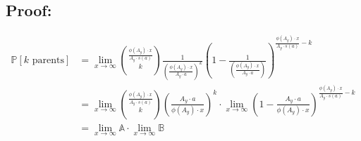 \documentclass{article}
\theoremstyle{definition}
\begin{document}
\subsection*{Proof:}
\begin{align*}
    \mathbb{P}[k \text{ parents}] & =  \lim_{x \to \infty}{\frac{\phi(A_y) \cdot x}{A_y \cdot s(a)} \choose k } \frac{1}{\left(\frac{\phi(A_y) \cdot x}{ A_y \cdot a}\right)^k} \left(1- \frac{1}{\left(\frac{\phi(A_y) \cdot x}{ A_y \cdot a}\right)}\right)^{\frac{\phi(A_y) \cdot x}{A_y \cdot s(a)  } -k} \\
                                  & =  \lim_{x \to \infty}{\frac{\phi(A_y) \cdot x}{A_y \cdot s(a)} \choose k } \left(\frac{A_y \cdot a}{\phi(A_y) \cdot x}\right)^k \cdot \lim_{x \to \infty}\left(1- \frac{A_y \cdot a}{\phi(A_y) \cdot x}\right)^{\frac{\phi(A_y) \cdot x}{A_y \cdot s(a)  } -k}           \\
                                  & =  \lim_{x \to \infty}\mathbb{A}  \cdot \lim_{x \to \infty} \mathbb{B}
\end{align*}
\end{document}

